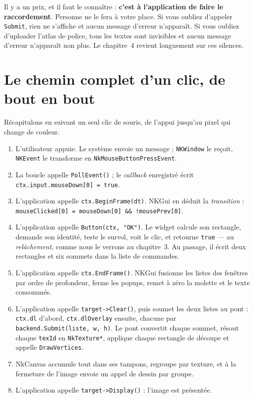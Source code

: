 Il y a un prix, et il faut le connaître : \textbf{c'est à l'application de faire
le raccordement}. Personne ne le fera à votre place. Si vous oubliez d'appeler
\texttt{Submit}, rien ne s'affiche et aucun message d'erreur n'apparaît. Si vous
oubliez d'uploader l'atlas de police, tous les textes sont invisibles et aucun
message d'erreur n'apparaît non plus. Le chapitre~4 revient longuement sur ces
silences.

\section{Le chemin complet d'un clic, de bout en bout}

Récapitulons en suivant un seul clic de souris, de l'appui jusqu'au pixel qui
change de couleur.

\begin{enumerate}
  \item L'utilisateur appuie. Le système envoie un message ; \texttt{NKWindow} le
        reçoit, \texttt{NKEvent} le transforme en
        \texttt{NkMouseButtonPressEvent}.
  \item La boucle appelle \texttt{PollEvent()} ; le \emph{callback} enregistré
        écrit \texttt{ctx.input.mouseDown[0] = true}.
  \item L'application appelle \texttt{ctx.BeginFrame(dt)}. NKGui en déduit la
        \emph{transition} : \texttt{mouseClicked[0] = mouseDown[0] \&\&
        !mousePrev[0]}.
  \item L'application appelle \texttt{Button(ctx, "OK")}. Le widget calcule son
        rectangle, demande son identité, teste le survol, voit le clic, et
        retourne \texttt{true} — au \emph{relâchement}, comme nous le verrons au
        chapitre~3. Au passage, il écrit deux rectangles et six sommets dans la
        liste de commandes.
  \item L'application appelle \texttt{ctx.EndFrame()}. NKGui fusionne les listes
        des fenêtres par ordre de profondeur, ferme les popups, remet à zéro la
        molette et le texte consommés.
  \item L'application appelle \texttt{target->Clear()}, puis soumet les deux
        listes au pont : \texttt{ctx.dl} d'abord, \texttt{ctx.dlOverlay}
        ensuite, chacune par \texttt{backend.Submit(liste, w, h)}. Le pont
        convertit chaque sommet, résout chaque \texttt{texId} en
        \texttt{NkTexture*}, applique chaque rectangle de découpe et appelle
        \texttt{DrawVertices}.
  \item NkCanvas accumule tout dans ses tampons, regroupe par texture, et à la
        fermeture de l'image envoie un appel de dessin par groupe.
  \item L'application appelle \texttt{target->Display()} : l'image est présentée.
\end{enumerate}

